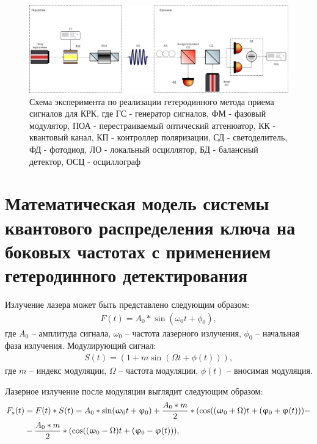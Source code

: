 \begin{figure}
    \centering
    \includegraphics[width = \linewidth]{images/Гетеродин схема новая2 .png}
    \caption{Схема эксперимента по реализации гетеродинного метода приема сигналов для КРК, где ГС - генератор сигналов, ФМ - фазовый модулятор, ПОА - перестраиваемый оптический аттенюатор, КК - квантовый канал, КП - контроллер поляризации, СД - светоделитель, ФД - фотодиод, ЛО - локальный осциллятор, БД - балансный детектор, ОСЦ - осциллограф}
    \label{fig:het true ch3}
\end{figure}
\section{Математическая модель системы квантового распределения ключа на боковых частотах с применением гетеродинного детектирования}\label{sec:ch3/sect4}
Излучение лазера может быть представлено следующим образом:
\begin{align}
F(t) = A_0 * \sin(\omega_0 t + \phi_0),
\end{align}
где $A_0$ -- амплитуда сигнала, $\omega_0$ -- частота лазерного излучения, $\phi_0$ -- начальная фаза излучения.
Модулирующий сигнал:
\begin{align}
S(t) = (1+ m\sin(\Omega t  + \phi (t))),
\end{align} 
где $m$ -- индекс модуляции, $\Omega$ -- частота модуляции, $\phi (t)$ -- вносимая модуляция.

Лазерное излучение после модуляции выглядит следующим образом:
\begin{align}
\label{eq:laser_het}
F_s(t) &= F(t) * S(t) = A_0 * \sin(\omega_0 t + \phi_0) + \frac{A_0 * m}{2} * (\cos((\omega_0 + \Omega)t + (\phi_0 + \phi (t))) - \notag \\
&- \frac{A_0 * m}{2} * (\cos((\omega_0 - \Omega)t + (\phi_0 - \phi (t))),
\end{align}

